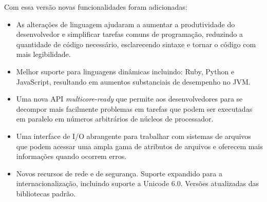Com essa versão novas funcionalidades foram adicionadas:

\begin{itemize}
  \item As alterações de linguagem ajudaram a aumentar a produtividade do desenvolvedor e simplificar tarefas comuns de programação, reduzindo a quantidade de código necessário, esclarecendo sintaxe e tornar o código com mais legibilidade.
  \item Melhor suporte para linguagens dinâmicas incluindo: Ruby, Python e JavaScript, resultando em aumentos substanciais de desempenho no \acs{JVM}.
  \item Uma nova API {\it multicore-ready} que permite aos desenvolvedores para se decompor mais facilmente problemas em tarefas que podem ser executadas em paralelo em números arbitrários de núcleos de processador.
  \item Uma interface de I/O abrangente para trabalhar com sistemas de arquivos que podem acessar uma ampla gama de atributos de arquivos e oferecem mais informações quando ocorrem erros.
  \item Novos recursos de rede e de segurança. Suporte expandido para a internacionalização, incluindo suporte a Unicode 6.0. Versões atualizadas das bibliotecas padrão.\\
\end{itemize}

